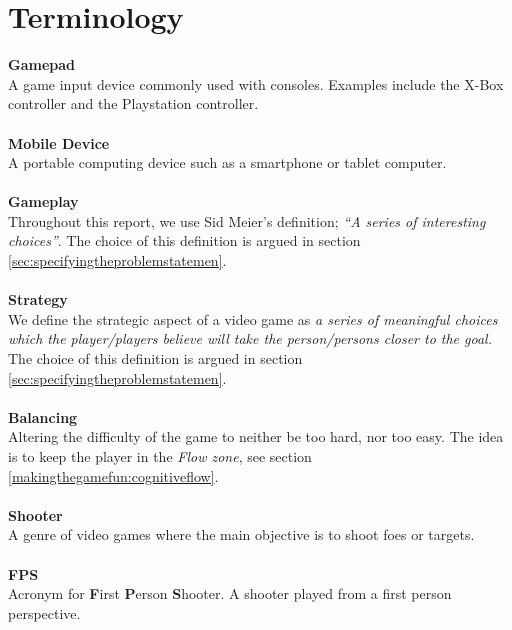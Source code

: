 \section*{Terminology}\label{preface:terminology}
\textbf{Gamepad}\vspace{4pt}\\
A game input device commonly used with consoles.
Examples include the X-Box controller and the Playstation controller.\\
\\
\textbf{Mobile Device}\vspace{4pt}\\
A portable computing device such as a smartphone or tablet computer.\cite{mobileOx}\\
\\
\textbf{Gameplay}\vspace{4pt}\\
Throughout this report, we use Sid Meier's definition; \textit{``A series of interesting choices''}\cite{GDC2012}.
The choice of this definition is argued in section \ref{sec:specifyingtheproblemstatemen}.\\
\\
\textbf{Strategy}\vspace{4pt}\\
We define the strategic aspect of a video game as \emph{a series of meaningful choices which the player/players believe will take the person/persons closer to the goal.}
The choice of this definition is argued in section \ref{sec:specifyingtheproblemstatemen}.\\
\\
\textbf{Balancing}\vspace{4pt}\\
Altering the difficulty of the game to neither be too hard, nor too easy.
The idea is to keep the player in the \textit{Flow zone}, see section \ref{makingthegamefun:cognitiveflow}.\\
\\
\textbf{Shooter}\vspace{4pt}\\
A genre of video games where the main objective is to shoot foes or targets. \cite{oxShooter}\\
\\
\textbf{FPS}\vspace{4pt}\\
Acronym for \textbf{F}irst \textbf{P}erson \textbf{S}hooter.
A shooter played from a first person perspective.\\
